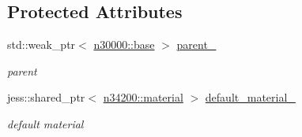 \subsection*{Protected Attributes}
\begin{DoxyCompactItemize}
\item 
std::weak\_\-ptr$<$ \hyperlink{classnebula_1_1content_1_1base}{n30000::base} $>$ \hyperlink{classnebula_1_1content_1_1physics_1_1base_a4b1990c57e38170ea69cbe7ae5ca8b70}{parent\_\-}
\begin{DoxyCompactList}\small\item\em parent \item\end{DoxyCompactList}\item 
jess::shared\_\-ptr$<$ \hyperlink{classnebula_1_1content_1_1actor_1_1physics_1_1material}{n34200::material} $>$ \hyperlink{classnebula_1_1content_1_1physics_1_1base_a648b28fd4c586b69c2f09ff51e539d5a}{default\_\-material\_\-}
\begin{DoxyCompactList}\small\item\em default material \item\end{DoxyCompactList}\end{DoxyCompactItemize}
